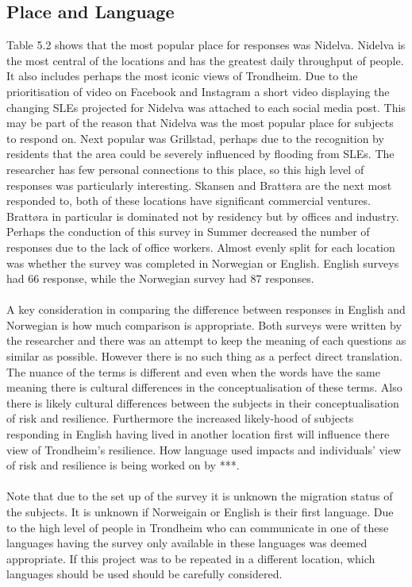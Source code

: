 \subsection{Place and Language}
Table 5.2 shows that the most popular place for responses was Nidelva. Nidelva is the most central of the locations and has the greatest daily throughput of people. It also includes perhaps the most iconic views of Trondheim. Due to the prioritisation of video on Facebook and Instagram a short video displaying the changing SLEs projected for Nidelva was attached to each social media post. This may be part of the reason that Nidelva was the most popular place for subjects to respond on.  Next popular was Grillstad, perhaps due to the recognition by residents that the area could be severely influenced by flooding from SLEs. The researcher has few personal connections to this place, so this high level of responses was particularly interesting. Skansen and Brattøra are the next most responded to, both of these locations have significant commercial ventures. Brattøra in particular is dominated not by residency but by offices and industry. Perhaps the conduction of this survey in Summer decreased the number of responses due to the lack of office workers. Almost evenly split for each location was whether the survey was completed in Norwegian or English. English surveys had 66 response, while the Norwegian survey had 87 responses.
\paragraph{}
A key consideration in comparing the difference between responses in English and Norwegian is how much comparison is appropriate. Both surveys were written by the researcher and there was an attempt to keep the meaning of each questions as similar as possible. However there is no such thing as a perfect direct translation. The nuance of the terms is different and even when the words have the same meaning there is cultural differences in the conceptualisation of these terms. Also there is likely cultural differences between the subjects in their conceptualisation of risk and resilience. Furthermore the increased likely-hood of subjects responding in English having lived in another location first will influence there view of Trondheim's resilience. How language used impacts and individuals' view of risk and resilience is being worked on by ***.

\paragraph{}
Note that due to the set up of the survey it is unknown the migration status of the subjects. It is unknown if Norweigain or English is their first language. Due to the high level of people in Trondheim who can communicate in one of these languages having the survey only available in these languages was deemed appropriate. If this project was to be repeated in a different location, which languages should be used should be carefully considered.


